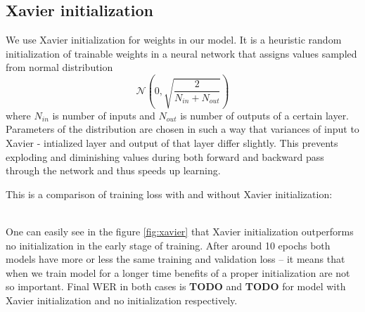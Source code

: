 \documentclass[licencjacka,en]{pracamgr}
\begin{document}
\subsection{Xavier initialization}
We use Xavier initialization \cite{XAVIER} for weights in our model. It is a heuristic random initialization of trainable weights in a neural network that assigns values sampled from normal distribution $$\mathcal{N}\left(0, \sqrt{\frac{2}{N_{in} + N_{out}}}\right)$$ where $N_{in}$ is number of inputs and $N_{out}$ is number of outputs of a certain layer. Parameters of the distribution are chosen in such a way that variances of input to Xavier - intialized layer and output of that layer differ slightly. This prevents exploding and diminishing values during both forward and backward pass through the network and thus speeds up learning.

This is a comparison of training loss with and without Xavier initialization:

\noindent%
\begin{minipage}{\linewidth}%
		\label{fig:xavier}		     
\end{minipage}\\


One can easily see in the figure \ref{fig:xavier} that Xavier initialization outperforms no initialization in the early stage of training. After around 10 epochs both models have more or less the same training and validation loss -- it means that when we train model for a longer time benefits of a proper initialization are not so important. Final WER in both cases is \textbf{TODO} and \textbf{TODO} for model with Xavier initialization and no initialization respectively. 
\end{document}
